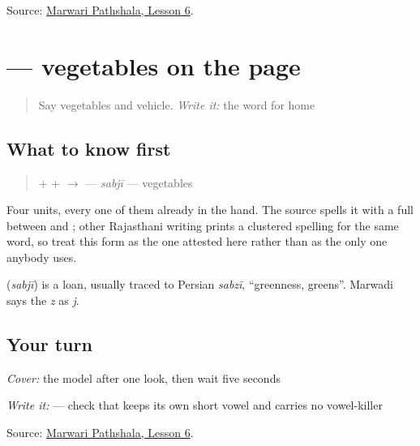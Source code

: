 \begin{tcolorbox}[breakable,colback=teal!4,colframe=teal!35!black,title={Before you move on}]
Source: \href{https://www.marwaripathshala.com/marwari-lesson-6-english}{Marwari Pathshala, Lesson 6}.
\end{tcolorbox}
\section[\texorpdfstring{\mw{सबजी} (sabjī)}{सबजी (sabjī)}]{ — vegetables on the page}

\label{lesson:MW-C18-sabji}



\begin{quote}
Say vegetables and vehicle. \emph{Write it:} the word for home
\end{quote}

\subsection*{What to know first}
\begin{quote}
\textbf{} + \textbf{} + \textbf{} $\to$ \textbf{} — \emph{sabjī} — vegetables
\end{quote}

Four units, every one of them already in the hand. The source spells it with a full \textbf{} between \textbf{} and \textbf{}; other Rajasthani writing prints a clustered spelling for the same word, so treat this form as the one attested here rather than as the only one anybody uses.

\begin{cousinweb}
\textbf{} (\emph{sabjī}) is a loan, usually traced to Persian \emph{sabzī}, \textquotedblleft{}greenness, greens\textquotedblright{}. Marwadi says the \emph{z} as \emph{j}.
\end{cousinweb}

\subsection*{Your turn}
\emph{Cover:} the model after one look, then wait five seconds

\emph{Write it:} \textbf{} — check that \textbf{} keeps its own short vowel and carries no vowel-killer

\begin{tcolorbox}[breakable,colback=teal!4,colframe=teal!35!black,title={Before you move on}]
Source: \href{https://www.marwaripathshala.com/marwari-lesson-6-english}{Marwari Pathshala, Lesson 6}.
\end{tcolorbox}
